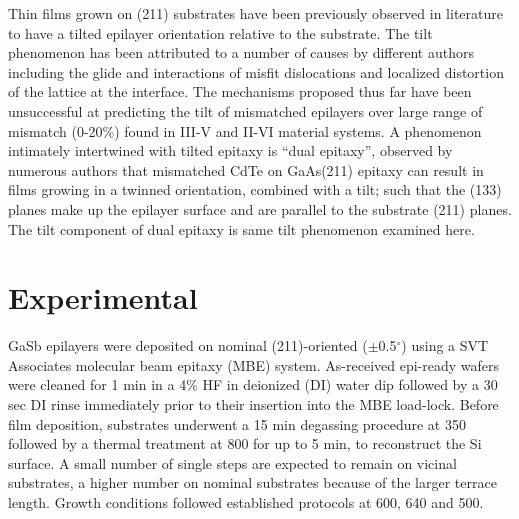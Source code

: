 Thin films grown on (211) substrates have been previously observed in literature to have a tilted epilayer orientation relative to the substrate\cite{Zhao2011,Wang2006,Dhar1997a,Lange1991,Nakamura1992}.
The tilt phenomenon has been attributed to a number of causes by different authors including the glide and interactions of misfit dislocations \cite{Olsen1975,Riesz1994,Ayers1991,Johnson2011} and localized distortion of the lattice at the interface\cite{Sasaki1992}.
The mechanisms proposed thus far have been unsuccessful at predicting the tilt of mismatched epilayers over large range of mismatch (0-20\%) found in III-V and II-VI material systems.
A phenomenon intimately intertwined with tilted epitaxy is ``dual epitaxy'', observed by numerous authors\cite{Li1995a,Nakamura1992,Rujirawat1998,Lange1991} that mismatched CdTe on GaAs(211) epitaxy can result in films growing in a twinned orientation, combined with a tilt; such that the (133) planes make up the epilayer surface and are parallel to the substrate (211) planes.
The tilt component of dual epitaxy is same tilt phenomenon examined here.

\section{Experimental}
GaSb epilayers were deposited on nominal (211)-oriented (\(\pm\)0.5\(^\circ\)) using a SVT Associates molecular beam epitaxy (MBE) system.
As-received epi-ready wafers were cleaned for 1 min in a 4\% HF in deionized (DI) water dip followed by a 30 sec DI rinse immediately prior to their insertion into the MBE load-lock.
Before film deposition, substrates underwent a 15 min degassing procedure at 350\celsius{} followed by a thermal treatment at 800\celsius{} for up to 5 min, to reconstruct the Si surface.
A small number of single steps are expected to remain on vicinal substrates, a higher number on nominal substrates because of the larger terrace length.
Growth conditions followed established protocols\cite{Akahane2004,Balakrishnan2006a,Fischer1986} at 600, 640 and 500\celsius.

